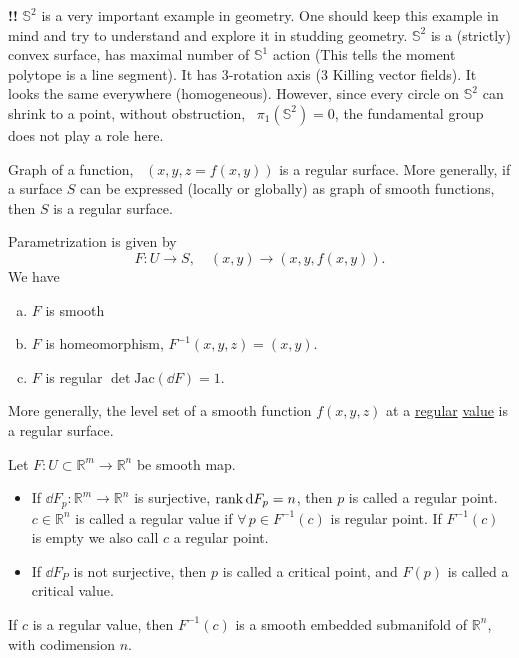 \textbf{\color{red}!!} \(\mathbb{S}^2\) is a very important example in geometry. One
should keep this example in mind and try to understand and explore it in studding
geometry. \(\mathbb{S}^2\) is a (strictly) convex surface, has maximal number
of \(\mathbb{S}^1\) action (This tells the moment polytope is a line segment).
It has 3-rotation axis (3 Killing vector fields). It looks the same everywhere
(homogeneous). However, since every circle on \(\mathbb{S}^2\) can shrink to a point,
without obstruction, \ie\ \(\pi_1(\mathbb{S}^2)=0\), the fundamental group does not
play a role here.

\begin{example}[3]
    Graph of a function, \ie\ \((x,y,z=f(x,y))\) is a regular surface. More
    generally, if a surface \(S\) can be expressed (locally or globally) as graph
    of smooth functions, then \(S\) is a regular surface.
\end{example}
Parametrization is given by \[
    F\colon U\to S,\quad (x,y)\to (x,y,f(x,y))
.\] We have 
\begin{enumerate}[(a)]
    \item \(F\) is smooth \checkmark{}
    \item \(F\) is homeomorphism, \(F^{-1}(x,y,z)=(x,y)\).
    \item \(F\) is regular \(\det\mathrm{Jac}(\dd{F})=1\).
\end{enumerate}

\begin{example}[4]
    More generally, the level set of a smooth function \(f(x,y,z)\) at a
    \underline{regular} \underline{value} is a regular surface.
\end{example}

\begin{definition}
    Let \(F\colon U\subset \mathbb{R}^m\to \mathbb{R}^n\) be smooth map.
    \begin{itemize}
    \item If \(\dd{F_p}\colon\mathbb{R}^m\to \mathbb{R}^n\) is surjective, \ie 
        \(\rank\dd{F_p}=n\), then \(p\) is called a regular point. \(c\in
        \mathbb{R}^n\) is called a regular value if \(\forall\,p\in F^{-1}(c)\) is
        regular point. If \(F^{-1}(c)\) is empty we also call \(c\) a regular point.
    \item If \(\dd{F_P}\) is not surjective, then \(p\) is called a critical point,
        and \(F(p)\) is called a critical value.
    \end{itemize}
\end{definition}
\begin{remark}
    If \(c\) is a regular value, then \(F^{-1}(c)\) is a smooth embedded submanifold
    of \(\mathbb{R}^n\), with codimension \(n\).
\end{remark}


